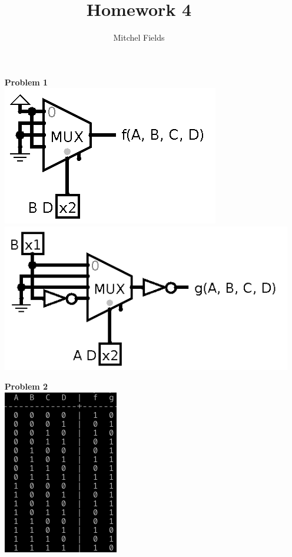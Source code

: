 \documentclass{article}
\title{Homework 4}
\author{Mitchel Fields}
\begin{document}
\maketitle

\begin{itemize}
	\item [\textbf{Problem 1}]\hspace{0pt}\\
	\includegraphics[scale=0.5]{hw4-1a}\\
	\includegraphics[scale=0.5]{hw4-1b}

	\item [\textbf{Problem 2}]\hspace{0pt}\\
	

	\includegraphics[]{hw4-2}


\end{itemize}
\end{document}
